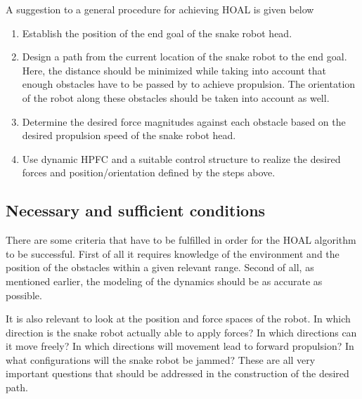 
A suggestion to a general procedure for achieving HOAL is given below

\begin{enumerate}
    \item Establish the position of the end goal of the snake robot head.
    \item Design a path from the current location of the snake robot to the end goal. Here, the distance should be minimized while taking into account that enough obstacles have to be passed by to achieve propulsion. The orientation of the robot along these obstacles should be taken into account as well.
    \item Determine the desired force magnitudes against each obstacle based on the desired propulsion speed of the snake robot head.
    \item Use dynamic HPFC and a suitable control structure to realize the desired forces and position/orientation defined by the steps above.
\end{enumerate}

\subsection{Necessary and sufficient conditions}

There are some criteria that have to be fulfilled in order for the HOAL algorithm to be successful. First of all it requires knowledge of the environment and the position of the obstacles within a given relevant range. Second of all, as mentioned earlier, the modeling of the dynamics should be as accurate as possible.

It is also relevant to look at the position and force spaces of the robot. In which direction is the snake robot actually able to apply forces? In which directions can it move freely? In which directions will movement lead to forward propulsion? In what configurations will the snake robot be jammed? These are all very important questions that should be addressed in the construction of the desired path.

